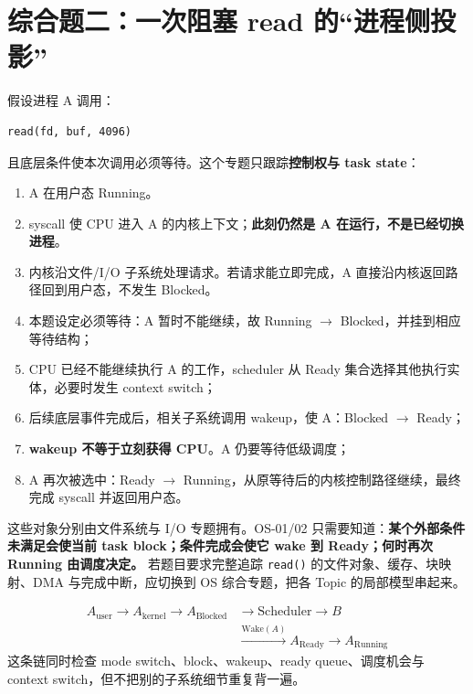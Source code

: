 \documentclass[11pt,a4paper]{ctexart}
\newcommand{\kw}[1]{\textbf{#1}}
\newcommand{\code}[1]{\texttt{#1}}
\begin{document}
\section{综合题二：一次阻塞 read 的“进程侧投影”}

假设进程 A 调用：
\begin{verbatim}
read(fd, buf, 4096)
\end{verbatim}
且底层条件使本次调用必须等待。这个专题只跟踪\kw{控制权与 task state}：

\begin{enumerate}
\item A 在用户态 Running。
\item syscall 使 CPU 进入 A 的内核上下文；\kw{此刻仍然是 A 在运行，不是已经切换进程}。
\item 内核沿文件/I/O 子系统处理请求。若请求能立即完成，A 直接沿内核返回路径回到用户态，不发生 Blocked。
\item 本题设定必须等待：A 暂时不能继续，故 Running $\to$ Blocked，并挂到相应等待结构；
\item CPU 已经不能继续执行 A 的工作，scheduler 从 Ready 集合选择其他执行实体，必要时发生 context switch；
\item 后续底层事件完成后，相关子系统调用 wakeup，使 A：Blocked $\to$ Ready；
\item \kw{wakeup 不等于立刻获得 CPU}。A 仍要等待低级调度；
\item A 再次被选中：Ready $\to$ Running，从原等待后的内核控制路径继续，最终完成 syscall 并返回用户态。
\end{enumerate}

\begin{method}
这些对象分别由文件系统与 I/O 专题拥有。OS-01/02 只需要知道：\kw{某个外部条件未满足会使当前 task block；条件完成会使它 wake 到 Ready；何时再次 Running 由调度决定。} 若题目要求完整追踪 \code{read()} 的文件对象、缓存、块映射、DMA 与完成中断，应切换到 OS 综合专题，把各 Topic 的局部模型串起来。
\end{method}

\begin{exam}[本专题必须能独立复原的过程]
\[
\boxed{
\begin{aligned}
A_{\text{user}} \rightarrow A_{\text{kernel}} \rightarrow A_{\text{Blocked}} &\rightarrow \text{Scheduler} \rightarrow B\\
&\xrightarrow{\text{Wake}(A)} A_{\text{Ready}} \rightarrow A_{\text{Running}}
\end{aligned}
}
\]
这条链同时检查 mode switch、block、wakeup、ready queue、调度机会与 context switch，但不把别的子系统细节重复背一遍。
\end{exam}
\end{document}
